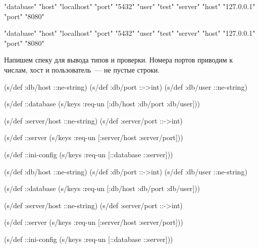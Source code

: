 \ifx\devicetype\mobile

\begin{english}
  \begin{clojure}
{"database" {"host" "localhost"
             "port" "5432"
             "user" "test"}
 "server" {"host" "127.0.0.1"
           "port" "8080"}}
  \end{clojure}
\end{english}

\else

\begin{english}
  \begin{clojure}
{"database" {"host" "localhost" "port" "5432" "user" "test"}
 "server" {"host" "127.0.0.1" "port" "8080"}}
  \end{clojure}
\end{english}

\fi

Напишем спеку для вывода типов и проверки. Номера портов приводим к числам, хост
и пользователь~--- не пустые строки.

\ifx\devicetype\mobile

\begin{english}
  \begin{clojure}
(s/def :db/host ::ne-string)
(s/def :db/port ::->int)
(s/def :db/user ::ne-string)

(s/def ::database
  (s/keys :req-un
    [:db/host :db/port :db/user]))

(s/def :server/host ::ne-string)
(s/def :server/port ::->int)

(s/def ::server
  (s/keys :req-un
    [:server/host :server/port]))

(s/def ::ini-config
  (s/keys :req-un [::database ::server]))
  \end{clojure}
\end{english}

\else

\begin{english}
  \begin{clojure}
(s/def :db/host ::ne-string)
(s/def :db/port ::->int)
(s/def :db/user ::ne-string)

(s/def ::database
  (s/keys :req-un [:db/host :db/port :db/user]))

(s/def :server/host ::ne-string)
(s/def :server/port ::->int)

(s/def ::server
  (s/keys :req-un [:server/host :server/port]))

(s/def ::ini-config
  (s/keys :req-un [::database ::server]))
  \end{clojure}
\end{english}

